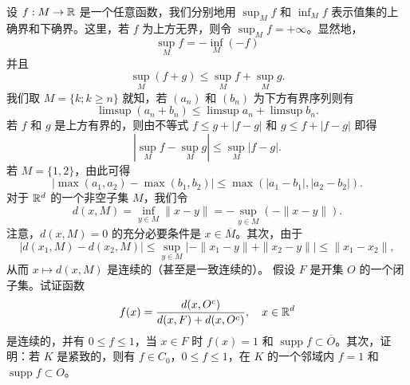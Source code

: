 设 $f:M\to\mathbb R$ 是一个任意函数，我们分别地用 $\sup_M f$ 和 $\inf_M f$ 表示值集的上确界和下确界。这里，若 $f$ 为上方无界，则令 $\sup_M f=+\infty$。显然地，
\[\sup_M f=-\inf_M(-f)\]
并且
\[\sup_M(f+g)\le\sup_M f+\sup_M g.\]
我们取 $M=\{k;k\ge n\}$ 就知，若 $(a_n)$ 和 $(b_n)$ 为下方有界序列则有
\[\limsup(a_n+b_n)\le\limsup a_n+\limsup b_n.\]
若 $f$ 和 $g$ 是上方有界的，则由不等式 $f\le g+|f-g|$ 和 $g\le f+|f-g|$ 即得
\[\left|\sup_M f-\sup_M g\right|\le\sup_M|f-g|.\]
若 $M=\{1,2\}$，由此可得
\[|\max(a_1,a_2)-\max(b_1,b_2)|\le\max(|a_1-b_1|,|a_2-b_2|).\]
对于 $\mathbb R^d$ 的一个非空子集 $M$，我们令
\[d(x,M)=\inf_{y\in M}\|x-y\|=-\sup_{y\in M}(-\|x-y\|).\]
注意，$d(x,M)=0$ 的充分必要条件是 $x\in\overline M$。其次，由于
\[|d(x_1,M)-d(x_2,M)|\le\sup_{y\in M}|-\|x_1-y\|+\|x_2-y\||\le\|x_1-x_2\|,\]
从而 $x\mapsto d(x,M)$ 是连续的（甚至是一致连续的）。
\Exercise 假设 $F$ 是开集 $O$ 的一个闭子集。试证函数
\[f(x)=\frac{d(x,O^c)}{d(x,F)+d(x,O^c)},\quad x\in\mathbb R^d\]
是连续的，并有 $0\le f\le1$，当 $x\in F$ 时 $f(x)=1$ 和 $\operatorname{supp}f\subset\overline O$。其次，证明：若 $K$ 是紧致的，则有 $f\in C_0$，$0\le f\le1$，在 $K$ 的一个邻域内 $f=1$ 和 $\operatorname{supp}f\subset O$。
